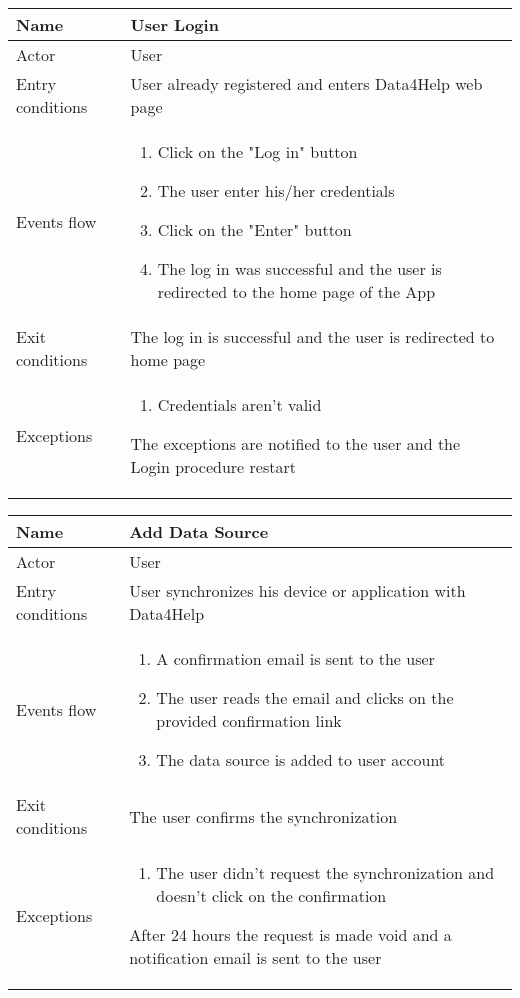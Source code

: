 \newpage
\begin{table}[h!]
\begin{tabular}{|l|p{12cm}|}
\hline
Name             & User Login \\ \hline
Actor            & User \\ \hline
Entry conditions & User already registered and enters Data4Help web page\\ \hline
Events flow      & \begin{enumerate}
\item Click on the "Log in" button
\item The user enter his/her credentials
\item Click on the "Enter" button
\item The log in was successful and the user is redirected to the home page of the App
\end{enumerate} \\ \hline
Exit conditions  & The log in is successful and the user is redirected to home page \\ \hline
Exceptions       & \begin{enumerate}
\item Credentials aren't valid
\end{enumerate} The exceptions are notified to the user and the Login procedure restart \\ \hline
\end{tabular}
\end{table}

\begin{table}[h!]
\begin{tabular}{|l|p{12cm}|}
\hline
Name             & Add Data Source \\ \hline
Actor            & User \\ \hline
Entry conditions & User synchronizes his device or application with Data4Help \\ \hline
Events flow      & \begin{enumerate}
\item A confirmation email is sent to the user
\item The user reads the email and clicks on the provided confirmation link
\item The data source is added to user account 
\end{enumerate} \\ \hline
Exit conditions  & The user confirms the synchronization \\ \hline
Exceptions       & \begin{enumerate}
\item The user didn't request the synchronization and doesn't click on the confirmation
\end{enumerate} After 24 hours the request is made void and a notification email 
is sent to the user \\ \hline 
\end{tabular} 
\end{table}


